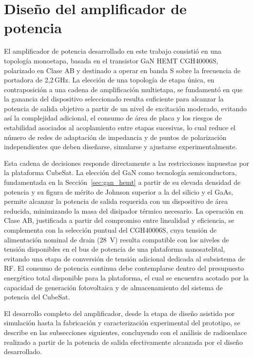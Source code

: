 \section{Diseño del amplificador de potencia} \label{sec:diseno_amplificador}
El amplificador de potencia desarrollado en este trabajo consistió en una topología monoetapa, basada en el transistor GaN HEMT CGH40006S, polarizado en Clase AB y destinado a operar en banda S sobre la frecuencia de portadora de 2,2\,GHz. La elección de una topología de etapa única, en contraposición a una cadena de amplificación multietapa, se fundamentó en que la ganancia del dispositivo seleccionado resulta suficiente para alcanzar la potencia de salida objetivo a partir de un nivel de excitación moderado, evitando así la complejidad adicional, el consumo de área de placa y los riesgos de estabilidad asociados al acoplamiento entre etapas sucesivas, lo cual reduce el número de redes de adaptación de impedancia y de puntos de polarización independientes que deben diseñarse, simularse y ajustarse experimentalmente.

Esta cadena de decisiones responde directamente a las restricciones impuestas por la plataforma CubeSat. La elección del GaN como tecnología semiconductora, fundamentada en la Sección~\ref{sec:gan_hemt} a partir de su elevada densidad de potencia y su figura de mérito de Johnson superior a la del silicio y el GaAs, permite alcanzar la potencia de salida requerida con un dispositivo de área reducida, minimizando la masa del disipador térmico necesario. La operación en Clase AB, justificada a partir del compromiso entre linealidad y eficiencia, se complementa con la selección puntual del CGH40006S, cuya tensión de alimentación nominal de drain (28~V) resulta compatible con los niveles de tensión disponibles en el bus de potencia de una plataforma nanosatelital, evitando una etapa de conversión de tensión adicional dedicada al subsistema de RF. El consumo de potencia continua debe contemplarse dentro del presupuesto energético total disponible para la plataforma, el cual se encuentra acotado por la capacidad de generación fotovoltaica y de almacenamiento del sistema de potencia del CubeSat.

El desarrollo completo del amplificador, desde la etapa de diseño asistido por simulación hasta la fabricación y caracterización experimental del prototipo, se describe en las subsecciones siguientes, concluyendo con el análisis de radioenlace realizado a partir de la potencia de salida efectivamente alcanzada por el diseño desarrollado.

